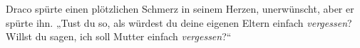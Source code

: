 Draco spürte einen plötzlichen Schmerz in seinem Herzen, unerwünscht, aber er spürte ihn. „Tust du so, als würdest du deine eigenen Eltern einfach \emph{vergessen}? Willst du sagen, ich soll Mutter einfach \emph{vergessen}?“

